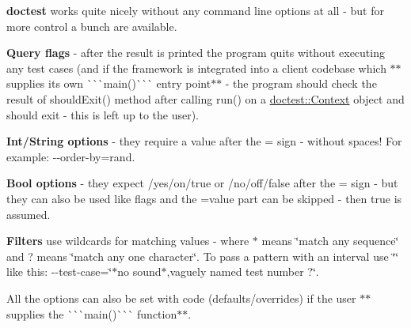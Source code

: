 {\bfseries{doctest}} works quite nicely without any command line options at all -\/ but for more control a bunch are available.

{\bfseries{Query flags}} -\/ after the result is printed the program quits without executing any test cases (and if the framework is integrated into a client codebase which $\ast$$\ast$supplies it\textquotesingle{}s own \`{}\`{}\`{}main()\`{}\`{}\`{} entry point$\ast$$\ast$ -\/ the program should check the result of {\ttfamily should\+Exit()} method after calling {\ttfamily run()} on a {\ttfamily \mbox{\hyperlink{classdoctest_1_1_context}{doctest\+::\+Context}}} object and should exit -\/ this is left up to the user).

{\bfseries{Int/\+String options}} -\/ they require a value after the {\ttfamily =} sign -\/ without spaces! For example\+: {\ttfamily -\/-\/order-\/by=rand}.

{\bfseries{Bool options}} -\/ they expect {}/{\ttfamily yes}/{\ttfamily on}/{\ttfamily true} or {}/{\ttfamily no}/{\ttfamily off}/{\ttfamily false} after the {\ttfamily =} sign -\/ but they can also be used like flags and the {\ttfamily =value} part can be skipped -\/ then {\ttfamily true} is assumed. ~\newline


{\bfseries{Filters}} use wildcards for matching values -\/ where {\ttfamily $\ast$} means \char`\"{}match any sequence\char`\"{} and {\ttfamily ?} means \char`\"{}match any one character\char`\"{}. To pass a pattern with an interval use {\ttfamily \char`\"{}\char`\"{}} like this\+: {\ttfamily -\/-\/test-\/case=\char`\"{}$\ast$no sound$\ast$,vaguely named test number ?\char`\"{}}.

All the options can also be set with code (defaults/overrides) if the user $\ast$$\ast$supplies the \`{}\`{}\`{}main()\`{}\`{}\`{} function$\ast$$\ast$.


